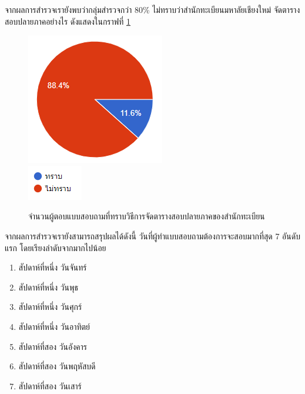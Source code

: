 จากผลการสำรวจเรายังพบว่ากลุ่มสำรวจกว่า 80\% ไม่ทราบว่าสำนักทะเบียนมหาลัยเชียงใหม่ จัดตารางสอบปลายภาคอย่างไร ดังแสดงในกราฟที่ \ref{fig:registration_exam}
\begin{figure}
  \begin{center}
    \includegraphics{images/registration_exam.png}\\[2ex]
    \includegraphics{images/legend_for_registration_exam.png}
  \end{center}
  \caption[Poem]{จำนวนผู้ตอบแบบสอบถามที่ทราบวิธีการจัดตารางสอบปลายภาคของสำนักทะเบียน}
  \label{fig:registration_exam}     
\end{figure}
จากผลการสำรวจเรายังสามารถสรุปผลได้ดังนี้
วันที่ผู้ทำแบบสอบถามต้องการจะสอบมากที่สุด 7 อันดับแรก โดยเรียงลำดับจากมากไปน้อย
\begin{enumerate}
  \item สัปดาห์ที่หนึ่ง วันจันทร์
  \item สัปดาห์ที่หนึ่ง วันพุธ
  \item สัปดาห์ที่หนึ่ง วันศุกร์ 
  \item สัปดาห์ที่หนึ่ง วันอาทิตย์
  \item สัปดาห์ที่สอง วันอังคาร
  \item สัปดาห์ที่สอง วันพฤหัสบดี
  \item สัปดาห์ที่สอง วันเสาร์
\end{enumerate}

